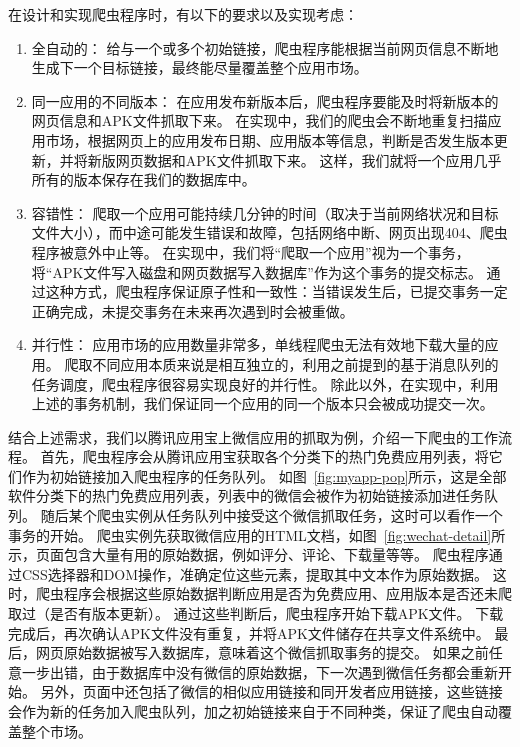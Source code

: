 在设计和实现爬虫程序时，有以下的要求以及实现考虑：
\begin{enumerate}
	\item 全自动的：
		给与一个或多个初始链接，爬虫程序能根据当前网页信息不断地生成下一个目标链接，最终能尽量覆盖整个应用市场。
	\item 同一应用的不同版本：
		在应用发布新版本后，爬虫程序要能及时将新版本的网页信息和APK文件抓取下来。
		在实现中，我们的爬虫会不断地重复扫描应用市场，根据网页上的应用发布日期、应用版本等信息，判断是否发生版本更新，并将新版网页数据和APK文件抓取下来。
		这样，我们就将一个应用几乎所有的版本保存在我们的数据库中。
	\item 容错性：
		爬取一个应用可能持续几分钟的时间（取决于当前网络状况和目标文件大小），而中途可能发生错误和故障，包括网络中断、网页出现404、爬虫程序被意外中止等。
		在实现中，我们将“爬取一个应用”视为一个事务，将“APK文件写入磁盘和网页数据写入数据库”作为这个事务的提交标志。
		通过这种方式，爬虫程序保证原子性和一致性：当错误发生后，已提交事务一定正确完成，未提交事务在未来再次遇到时会被重做。
	\item 并行性：
		应用市场的应用数量非常多，单线程爬虫无法有效地下载大量的应用。
		爬取不同应用本质来说是相互独立的，利用之前提到的基于消息队列的任务调度，爬虫程序很容易实现良好的并行性。
		除此以外，在实现中，利用上述的事务机制，我们保证同一个应用的同一个版本只会被成功提交一次。
\end{enumerate}


结合上述需求，我们以腾讯应用宝上微信应用的抓取为例，介绍一下爬虫的工作流程。
首先，爬虫程序会从腾讯应用宝获取各个分类下的热门免费应用列表，将它们作为初始链接加入爬虫程序的任务队列。
如图~\ref{fig:myapp-pop}所示，这是全部软件分类下的热门免费应用列表，列表中的微信会被作为初始链接添加进任务队列。
随后某个爬虫实例从任务队列中接受这个微信抓取任务，这时可以看作一个事务的开始。
爬虫实例先获取微信应用的HTML文档，如图~\ref{fig:wechat-detail}所示，页面包含大量有用的原始数据，例如评分、评论、下载量等等。
爬虫程序通过CSS选择器和DOM操作，准确定位这些元素，提取其中文本作为原始数据。
这时，爬虫程序会根据这些原始数据判断应用是否为免费应用、应用版本是否还未爬取过（是否有版本更新）。
通过这些判断后，爬虫程序开始下载APK文件。
下载完成后，再次确认APK文件没有重复，并将APK文件储存在共享文件系统中。
最后，网页原始数据被写入数据库，意味着这个微信抓取事务的提交。
如果之前任意一步出错，由于数据库中没有微信的原始数据，下一次遇到微信任务都会重新开始。
另外，页面中还包括了微信的相似应用链接和同开发者应用链接，这些链接会作为新的任务加入爬虫队列，加之初始链接来自于不同种类，保证了爬虫自动覆盖整个市场。

